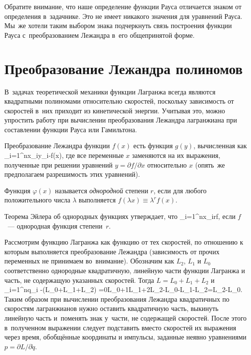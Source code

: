 \documentclass[a4paper,11pt]{article}
\def\[#1\]{\begin{align*}#1\end{align*}}
\newcommand\slashfrac[2]{{#1/#2}}
\theoremstyle{definition}
\begin{document}
Обратите внимание, что наше определение функции Рауса отличается знаком от
определения в~задачнике. Это не имеет никакого значения для уравнений Рауса.
Мы~же хотели таким выбором знака подчеркнуть связь построения функции Рауса
с~преобразованием Лежандра в~его общепринятой форме.

\section{Преобразование Лежандра полиномов}

В~задачах теоретической механики функции Лагранжа всегда являются квадратными
полиномами относительно скоростей, поскольку зависимость от скоростей в~них
приходит из кинетической энергии. Учитывая это, можно упростить работу при
вычислении преобразования Лежандра лагранжиана при составлении функции Рауса
или Гамильтона.

Преобразование Лежандра функции $f(x)$ есть функция $g(y)$, вычисленная как
	\[
	\sum_{i=1}^nx_iy_i-f(x),
	\]
где все переменные $x$ заменяются на их выражения, полученные при решении
уравнений $y=\slashfrac{\partial f}{\partial x}$ относительно $x$ (опять~же
предполагаем разрешимость этих уравнений).

Функция $\varphi(x)$ называется \emph{однородной\/} степени $r$, если для
любого положительного числа $\lambda$ выполняется $f(\lambda
x)\equiv\lambda^rf(x)$.

Теорема Эйлера об однородных функциях утверждает, что
	\[
	\sum_{i=1}^nx_i\equiv rf,
	\]
если $f$~— однородная функция степени~$r$.

Рассмотрим функцию Лагранжа как функцию от тех скоростей, по отношению к
которым выполняется преобразование Лежандра (зависимость от прочих переменных
не принимаем во~внимание). Обозначим как $L_2$, $L_1$ и $L_0$ соответственно
однородные квадратичную, линейную части функции Лагранжа и часть, не содержащую
указанных скоростей. Тогда $L=L_0+L_1+L_2$ и
	\[
	\sum_{i=1}^n\dot q_i\frac{\partial(L_0+L_1+L_2)}{\partial\dot q_i}
		-(L_0+L_1+L_2)
		=0L_0+1L_1+2L_2-L_0-L_1-L_2=L_2-L_0.
	\]
Таким образом при вычислении преобразования Лежандра квадратичных по скоростям
лагранжианов нужно оставить квадратичную часть, выкинуть линейную часть
и~поменять знак у~части, не содержащей скоростей. После этого в~полученном
выражении следует подставить вместо скоростей их выражения через время,
обобщённые координаты и импульсы, заданные неявно уравнениями
$p=\slashfrac{\partial L}{\partial\dot q}$.
\end{document}
